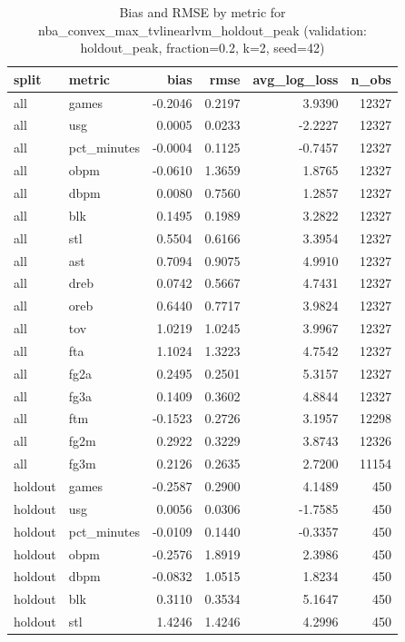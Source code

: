 \begin{table}
\caption{Bias and RMSE by metric for nba_convex_max_tvlinearlvm_holdout_peak (validation: holdout_peak, fraction=0.2, k=2, seed=42)}
\label{tab:nba_convex_max_tvlinearlvm_holdout_peak_vs_holdout_peak_f20_k2_s42_bias_rmse}
\begin{tabular}{llrrrr}
\toprule
split & metric & bias & rmse & avg\_log\_loss & n\_obs \\
\midrule
all & games & -0.2046 & 0.2197 & 3.9390 & 12327 \\
all & usg & 0.0005 & 0.0233 & -2.2227 & 12327 \\
all & pct\_minutes & -0.0004 & 0.1125 & -0.7457 & 12327 \\
all & obpm & -0.0610 & 1.3659 & 1.8765 & 12327 \\
all & dbpm & 0.0080 & 0.7560 & 1.2857 & 12327 \\
all & blk & 0.1495 & 0.1989 & 3.2822 & 12327 \\
all & stl & 0.5504 & 0.6166 & 3.3954 & 12327 \\
all & ast & 0.7094 & 0.9075 & 4.9910 & 12327 \\
all & dreb & 0.0742 & 0.5667 & 4.7431 & 12327 \\
all & oreb & 0.6440 & 0.7717 & 3.9824 & 12327 \\
all & tov & 1.0219 & 1.0245 & 3.9967 & 12327 \\
all & fta & 1.1024 & 1.3223 & 4.7542 & 12327 \\
all & fg2a & 0.2495 & 0.2501 & 5.3157 & 12327 \\
all & fg3a & 0.1409 & 0.3602 & 4.8844 & 12327 \\
all & ftm & -0.1523 & 0.2726 & 3.1957 & 12298 \\
all & fg2m & 0.2922 & 0.3229 & 3.8743 & 12326 \\
all & fg3m & 0.2126 & 0.2635 & 2.7200 & 11154 \\
holdout & games & -0.2587 & 0.2900 & 4.1489 & 450 \\
holdout & usg & 0.0056 & 0.0306 & -1.7585 & 450 \\
holdout & pct\_minutes & -0.0109 & 0.1440 & -0.3357 & 450 \\
holdout & obpm & -0.2576 & 1.8919 & 2.3986 & 450 \\
holdout & dbpm & -0.0832 & 1.0515 & 1.8234 & 450 \\
holdout & blk & 0.3110 & 0.3534 & 5.1647 & 450 \\
holdout & stl & 1.4246 & 1.4246 & 4.2996 & 450 \\

\end{tabular}
\end{table}
